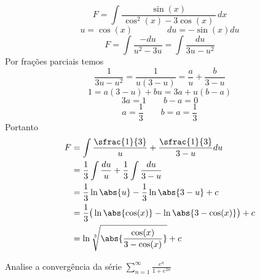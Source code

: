 \documentclass[a4paper,12pt,fleqn]{article}
\begin{document}
\begin{answer}
  \[
    F = \int \frac{\sin(x)}{\,\cos^2(x)- 3\cos(x)\,}\, dx
  \]
  \[
    u = \cos(x)
    \qquad\qquad
    du = -\sin(x)du
  \]
  \[
    F
    = \int \frac{-du}{u^2-3u}
    = \int \frac{du}{3u - u^2}
  \]
  Por frações parciais temos
  \[
    \frac{1}{3u-u^2}
    = \frac{1}{u(3-u)}
    = \frac{a}{u} + \frac{b}{3-u}
  \]
  \[
    1 = a(3-u) + bu = 3a + u(b-a)
  \]
  \[
    3a = 1 \qquad b-a = 0
  \]
  \[
    a = \frac{1}{3} \qquad b = a = \frac{1}{3}
  \]
  Portanto
  \begin{align*}
    F
    & = \int \frac{\sfrac{1}{3}}{u} + \frac{\sfrac{1}{3}}{3-u} du \\
    & = \frac{1}{3}\int \frac{du}{u} + \frac{1}{3}\int \frac{du}{3-u} \\
    & = \frac{1}{3}\ln\abs{u} - \frac{1}{3}\ln\abs{3-u} + c \\
    & = \frac{1}{3}\big(\ln\abs{\cos(x)} - \ln\abs{3-\cos(x)}\big) + c \\
    & = \ln\sqrt[3]{\abs{\frac{\cos(x)}{3-\cos(x)}}} + c
  \end{align*}

\end{answer}

Analise a convergência da série
\(
  \sum_{n=1}^\infty \frac{e^n}{1+e^{2n}}
\)
\end{document}
